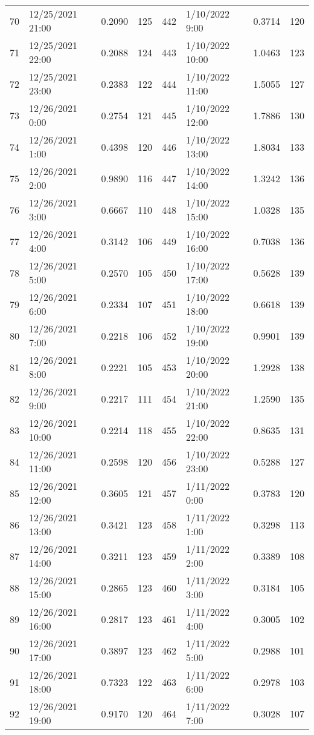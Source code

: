 \begin{center}
\begin{longtable}{llccllcc}
    70&12/25/2021  21:00&0.2090&125&442&1/10/2022 9:00	    &0.3714&120 \\
    71&12/25/2021  22:00&0.2088&124&443&1/10/2022 10:00	    &1.0463&123 \\
    72&12/25/2021  23:00&0.2383&122&444&1/10/2022 11:00	    &1.5055&127 \\
    73&12/26/2021  0:00	   &0.2754&121&445&1/10/2022 12:00	    &1.7886&130 \\
    74&12/26/2021  1:00	   &0.4398&120&446&1/10/2022 13:00	    &1.8034&133 \\
    75&12/26/2021  2:00	   &0.9890&116&447&1/10/2022 14:00	    &1.3242&136 \\
    76&12/26/2021  3:00	   &0.6667&110&448&1/10/2022 15:00	    &1.0328&135 \\
    77&12/26/2021  4:00	   &0.3142&106&449&1/10/2022 16:00	    &0.7038&136 \\
    78&12/26/2021  5:00	   &0.2570&105&450&1/10/2022 17:00	    &0.5628&139 \\
    79&12/26/2021  6:00	   &0.2334&107&451&1/10/2022 18:00	    &0.6618&139 \\
    80&12/26/2021  7:00	   &0.2218&106&452&1/10/2022 19:00	    &0.9901&139 \\
    81&12/26/2021  8:00	   &0.2221&105&453&1/10/2022 20:00	    &1.2928&138 \\
    82&12/26/2021  9:00	   &0.2217&111&454&1/10/2022 21:00	    &1.2590&135 \\
    83&12/26/2021  10:00&0.2214&118&455&1/10/2022 22:00	    &0.8635&131 \\
    84&12/26/2021  11:00&0.2598&120&456&1/10/2022 23:00	    &0.5288&127 \\
    85&12/26/2021  12:00&0.3605&121&457&1/11/2022 0:00	    &0.3783&120 \\
    86&12/26/2021  13:00&0.3421&123&458&1/11/2022 1:00	    &0.3298&113 \\
    87&12/26/2021  14:00&0.3211&123&459&1/11/2022 2:00	    &0.3389&108 \\
    88&12/26/2021  15:00&0.2865&123&460&1/11/2022 3:00	    &0.3184&105 \\
    89&12/26/2021  16:00&0.2817&123&461&1/11/2022 4:00	    &0.3005&102 \\
    90&12/26/2021  17:00&0.3897&123&462&1/11/2022 5:00	    &0.2988&101 \\
    91&12/26/2021  18:00&0.7323&122&463&1/11/2022 6:00	    &0.2978&103 \\
    92&12/26/2021  19:00&0.9170&120&464&1/11/2022 7:00	    &0.3028&107 \\

\end{longtable}
\end{center}
